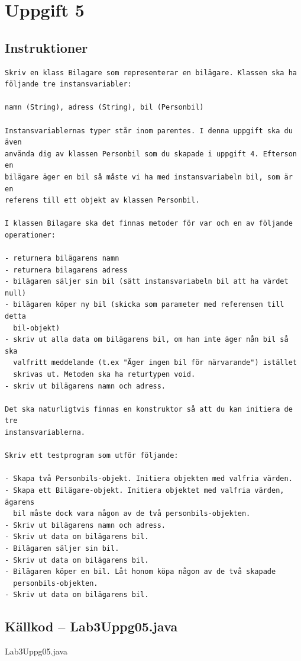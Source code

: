\section{Uppgift 5}\label{sec:uppg05}

\subsection{Instruktioner}
\begin{verbatim}
Skriv en klass Bilagare som representerar en bilägare. Klassen ska ha
följande tre instansvariabler:

namn (String), adress (String), bil (Personbil)

Instansvariablernas typer står inom parentes. I denna uppgift ska du även
använda dig av klassen Personbil som du skapade i uppgift 4. Efterson en
bilägare äger en bil så måste vi ha med instansvariabeln bil, som är en
referens till ett objekt av klassen Personbil.

I klassen Bilagare ska det finnas metoder för var och en av följande
operationer:

- returnera bilägarens namn
- returnera bilagarens adress
- bilägaren säljer sin bil (sätt instansvariabeln bil att ha värdet null)
- bilägaren köper ny bil (skicka som parameter med referensen till detta
  bil-objekt)
- skriv ut alla data om bilägarens bil, om han inte äger nån bil så ska
  valfritt meddelande (t.ex "Äger ingen bil för närvarande") istället
  skrivas ut. Metoden ska ha returtypen void.
- skriv ut bilägarens namn och adress.

Det ska naturligtvis finnas en konstruktor så att du kan initiera de tre
instansvariablerna.

Skriv ett testprogram som utför följande:

- Skapa två Personbils-objekt. Initiera objekten med valfria värden.
- Skapa ett Bilägare-objekt. Initiera objektet med valfria värden, ägarens
  bil måste dock vara någon av de två personbils-objekten.
- Skriv ut bilägarens namn och adress.
- Skriv ut data om bilägarens bil.
- Bilägaren säljer sin bil.
- Skriv ut data om bilägarens bil.
- Bilägaren köper en bil. Låt honom köpa någon av de två skapade
  personbils-objekten.
- Skriv ut data om bilägarens bil.
\end{verbatim}


\subsection{Källkod -- Lab3Uppg05.java}
\caption{Lab3Uppg05.java}
\label{src:uppg05}

